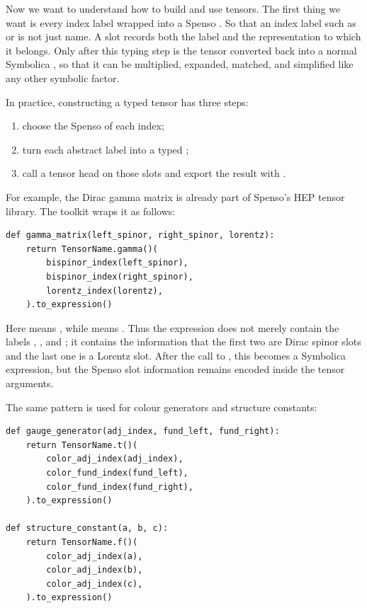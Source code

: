 Now we want to understand how to build and use tensors. The first thing we want is every index label wrapped into a Spenso . So that an index label such as  or  is not just name. A slot records both the label and the representation to which it belongs. Only after this typing step is the tensor converted back into a normal Symbolica , so that it can be multiplied, expanded, matched, and simplified like any other symbolic factor.

In practice, constructing a typed tensor has three steps:
\begin{enumerate}
    \item choose the Spenso  of each index;
    \item turn each abstract label into a typed ;
    \item call a tensor head on those slots and export the result with .
\end{enumerate}

For example, the Dirac gamma matrix is already part of Spenso's HEP tensor library. The toolkit wraps it as follows:
\begin{verbatim}
def gamma_matrix(left_spinor, right_spinor, lorentz):
    return TensorName.gamma()(
        bispinor_index(left_spinor),
        bispinor_index(right_spinor),
        lorentz_index(lorentz),
    ).to_expression()
\end{verbatim}

Here  means
, while 
means . Thus the expression does not merely
contain the labels , , and ; it
contains the information that the first two are Dirac spinor slots and the last
one is a Lorentz slot. After the call to , this becomes a
Symbolica expression, but the Spenso slot information remains encoded inside the
tensor arguments.

The same pattern is used for colour generators and structure constants:
\begin{verbatim}
def gauge_generator(adj_index, fund_left, fund_right):
    return TensorName.t()(
        color_adj_index(adj_index),
        color_fund_index(fund_left),
        color_fund_index(fund_right),
    ).to_expression()

def structure_constant(a, b, c):
    return TensorName.f()(
        color_adj_index(a),
        color_adj_index(b),
        color_adj_index(c),
    ).to_expression()
\end{verbatim}

